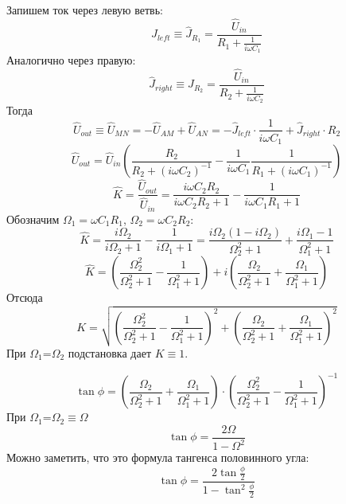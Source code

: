 Запишем ток через левую ветвь:
\begin{equation}
	\hat{J}_{left}\equiv \hat{J}_{R_1}=\frac{\hat{U}_{in}}{R_1+\frac{1}{i\omega C_1}}
\end{equation}
Аналогично через правую:
\begin{equation}
	\hat{J}_{right}\equiv \hat{J}_{R_2}=\frac{\hat{U}_{in}}{R_2+\frac{1}{i\omega C_2}}
\end{equation}
Тогда 
\begin{equation}
	\hat{U}_{out}\equiv\hat{U}_{MN}=
	-\hat{U}_{AM}+\hat{U}_{AN}=
	-\hat{J}_{left}\cdot\frac{1}{i\omega C_1}
	+\hat{J}_{right}\cdot R_2
\end{equation}
\begin{equation}
	\hat{U}_{out}=\hat{U}_{in}
	\left(
	\frac{R_2}{R_2+(i\omega C_2)^{-1}}-
	\frac{1}{i\omega C_1}\frac{1}{R_1+(i\omega C_1)^{-1}}
	\right)
\end{equation}
\begin{equation}
	\hat{K}=\frac{\hat{U}_{out}}{\hat{U}_{in}}=
	\frac{i\omega C_2 R_2}{i\omega C_2 R_2+1}-
	\frac{1}{i\omega C_1 R_1+1}
\end{equation}
Обозначим $\Omega_1=\omega C_1R_1$, $\Omega_2=\omega C_2R_2$:
\begin{equation}
	\hat{K}=\frac{i\Omega_2}{i\Omega_2+1}-\frac{1}{i\Omega_1+1}=
	\frac{i\Omega_2(1-i\Omega_2)}{\Omega_2^2+1}+\frac{i\Omega_1-1}{\Omega_1^2+1}
\end{equation}
\begin{equation}
	\hat{K}=
	\left(
		\frac{\Omega_2^2}{\Omega_2^2+1}-
		\frac{1}{\Omega_1^2+1}
	\right)+
	i\left(
		\frac{\Omega_2}{\Omega_2^2+1}+
		\frac{\Omega_1}{\Omega_1^2+1}
	\right)
\end{equation}
Отсюда
\begin{equation}
	K=
	\sqrt{
	\left(
		\frac{\Omega_2^2}{\Omega_2^2+1}-
		\frac{1}{\Omega_1^2+1}
	\right)^2+
	\left(
		\frac{\Omega_2}{\Omega_2^2+1}+
		\frac{\Omega_1}{\Omega_1^2+1}
	\right)^2
	}
\end{equation}
При $\Omega_1$=$\Omega_2$ подстановка дает $K\equiv 1$.

\begin{equation}
	\tan\phi=\left(
		\frac{\Omega_2}{\Omega_2^2+1}+
		\frac{\Omega_1}{\Omega_1^2+1}
	\right)
	\cdot
	\left(
		\frac{\Omega_2^2}{\Omega_2^2+1}-
		\frac{1}{\Omega_1^2+1}
	\right)^{-1}
\end{equation}
При $\Omega_1$=$\Omega_2 \equiv \Omega$
\begin{equation}
	\tan\phi=\frac{2\Omega}{1-\Omega^2}
\end{equation}
Можно заметить, что это формула тангенса половинного угла:
\begin{equation}
	\tan\phi=\frac{2\tan\frac{\phi}{2}}{1-\tan^2\frac{\phi}{2}}
\end{equation}


